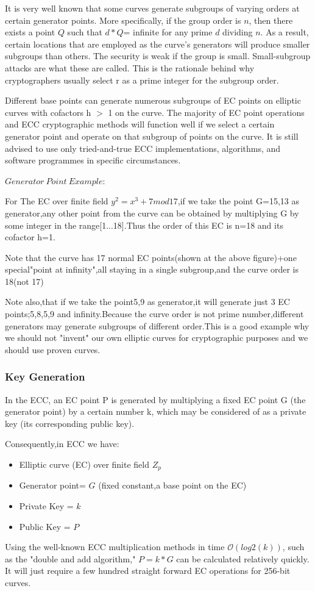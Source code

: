 \documentclass{article}
\begin{document}
It is very well known that some curves generate subgroups of varying orders at certain generator points. More specifically, if the group order is $n$, then there exists a point $Q$ such that $d * Q $= infinite for any prime $d$ dividing $n$. As a result, certain locations that are employed as the curve's generators will produce smaller subgroups than others. The security is weak if the group is small. Small-subgroup attacks are what these are called. This is the rationale behind why cryptographers usually select r as a prime integer for the subgroup order.

Different base points can generate numerous subgroups of EC points on elliptic curves with cofactors h $>$ 1 on the curve. The majority of EC point operations and ECC cryptographic methods will function well if we select a certain generator point and operate on that subgroup of points on the curve. It is still advised to use only tried-and-true ECC implementations, algorithms, and software programmes in specific circumstances.

$Generator \:Point \:Example$:

For The EC over finite field \(y^2=x^3+7mod17\),if we take the point G={15,13} as generator,any other point from the curve can be obtained by multiplying G by some integer in the range[1...18].Thus the order of this EC is n=18 and its cofactor h=1.

Note that the curve has 17 normal EC points(shown at the above figure)+one special"point at infinity",all staying in a single subgroup,and the curve order is 18(not 17)

Note also,that if we take the point{5,9} as generator,it will generate just 3 EC points;{5,8},{5,9} and infinity.Because the curve order is not prime number,different generators may generate subgroups of different order.This is a good example why we should not "invent" our own elliptic curves for cryptographic purposes and we should use proven curves.
\subsubsection{Key Generation}
In the ECC, an EC point P is generated by multiplying a fixed EC point G (the generator point) by a certain number k, which may be considered of as a private key (its corresponding public key).

Consequently,in ECC we have:
\begin{itemize}
    \item Elliptic curve (EC) over finite field $Z_{p}$
    \item Generator point= $G$ (fixed constant,a base point on the EC)
    \item Private Key = $k$
    \item Public Key = $P$
\end{itemize}
Using the well-known ECC multiplication methods in time $\mathcal{O}(log2(k))$, such as the "double and add algorithm," $P=k*G$ can be calculated relatively quickly. It will just require a few hundred straight forward EC operations for 256-bit curves.
\end{document}
